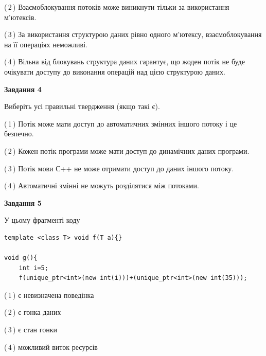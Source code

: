 \documentclass[12pt, ukrainian]{article}
\begin{document}
\begin {large}
{(\,2\,) Взаємоблокування потоків може виникнути тільки за використання м’ютексів.%

(\,3\,) За використання структурою даних рівно одного м’ютексу, взаємоблокування на її операціях неможливі.%

(\,4\,) Вільна від блокувань структура даних гарантує, що жоден потік не буде очікувати доступу до виконання операцій над цією структурою даних.%



\begin{center}
\textbf{Завдання 4}
\end{center}
Виберіть усі правильні твердження (якщо такі є).\par
\vspace{2mm}

(\,1\,) Потік може мати доступ до автоматичних змінних іншого потоку і це безпечно.%

(\,2\,) Кожен потік програми може мати доступ до динамічних даних програми.%

(\,3\,) Потік мови С++ не може отримати доступ до даних іншого потоку.%

(\,4\,) Автоматичні змінні не можуть розділятися між потоками.%



\begin{center}
\textbf{Завдання 5}
\end{center}
У цьому фрагменті коду
\begin{verbatim}
template <class T> void f(T a){}

void g(){
    int i=5;
    f(unique_ptr<int>(new int(i)))+(unique_ptr<int>(new int(35)));
\end{verbatim}
(\,1\,) є невизначена поведінка%

(\,2\,) є гонка даних%

(\,3\,) є стан гонки%

(\,4\,) можливий виток ресурсів%


}
\end {large}
\end{document}
